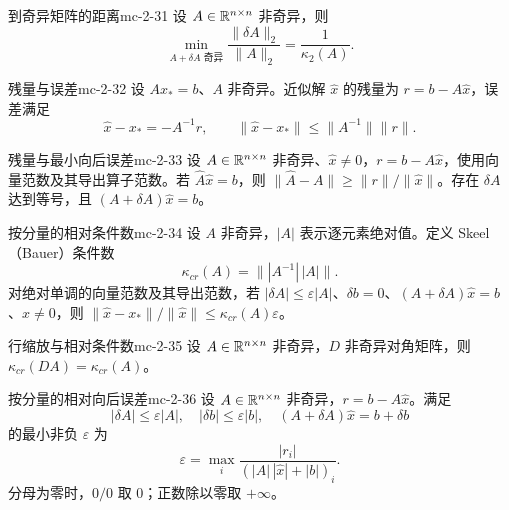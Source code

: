 \begin{theorem}{到奇异矩阵的距离}{mc-2-31}
设 $A\in\mathbb{R}^{n\times n}$ 非奇异，则
\[\min_{A+\delta A\text{ 奇异}}\frac{\|\delta A\|_2}{\|A\|_2}=\frac1{\kappa_2(A)}.\]
\end{theorem}

\begin{definition}{残量与误差}{mc-2-32}
设 $Ax_*=b$、$A$ 非奇异。近似解 $\widehat x$ 的残量为 $r=b-A\widehat x$，误差满足
\[\widehat x-x_*=-A^{-1}r,\qquad\|\widehat x-x_*\|\leq\|A^{-1}\|\|r\|.\]
\end{definition}

\begin{theorem}{残量与最小向后误差}{mc-2-33}
设 $A\in\mathbb{R}^{n\times n}$ 非奇异、$\widehat x\ne0$，$r=b-A\widehat x$，使用向量范数及其导出算子范数。若 $\widehat A\widehat x=b$，则 $\|\widehat A-A\|\geq\|r\|/\|\widehat x\|$。存在 $\delta A$ 达到等号，且 $(A+\delta A)\widehat x=b$。
\end{theorem}

\begin{definition}{按分量的相对条件数}{mc-2-34}
设 $A$ 非奇异，$|A|$ 表示逐元素绝对值。定义 Skeel（Bauer）条件数
\[\kappa_{cr}(A)=\bigl\||A^{-1}|\,|A|\bigr\|.\]
对绝对单调的向量范数及其导出范数，若 $|\delta A|\leq\varepsilon|A|$、$\delta b=0$、$(A+\delta A)\widehat x=b$、$\widehat x\ne0$，则 $\|\widehat x-x_*\|/\|\widehat x\|\leq\kappa_{cr}(A)\varepsilon$。
\end{definition}

\begin{lemma}{行缩放与相对条件数}{mc-2-35}
设 $A\in\mathbb{R}^{n\times n}$ 非奇异，$D$ 非奇异对角矩阵，则 $\kappa_{cr}(DA)=\kappa_{cr}(A)$。
\end{lemma}

\begin{theorem}{按分量的相对向后误差}{mc-2-36}
设 $A\in\mathbb{R}^{n\times n}$ 非奇异，$r=b-A\widehat x$。满足
\[|\delta A|\leq\varepsilon|A|,\quad|\delta b|\leq\varepsilon|b|,\quad(A+\delta A)\widehat x=b+\delta b\]
的最小非负 $\varepsilon$ 为
\[\varepsilon=\max_i\frac{|r_i|}{(|A|\,|\widehat x|+|b|)_i}.\]
分母为零时，$0/0$ 取 $0$；正数除以零取 $+\infty$。
\end{theorem}

